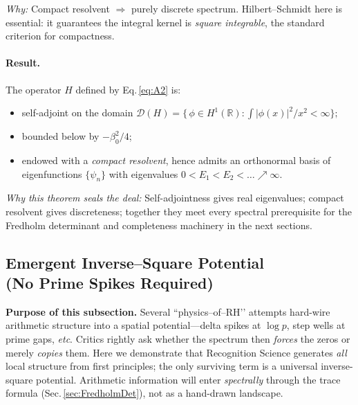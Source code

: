 \documentclass[11pt]{article}
\begin{document}
\emph{Why:}  Compact resolvent $\Rightarrow$ purely discrete spectrum.
Hilbert–Schmidt here is essential: it guarantees the integral kernel is
\emph{square integrable}, the standard criterion for compactness.

\vspace{.3em}
\paragraph{Result.}

\begin{theorem}
\label{thm:SAcompact}
The operator \(H\) defined by Eq.\,\eqref{eq:A2} is:

\begin{itemize}
\item self-adjoint on the domain
      \(
         \mathcal D(H)
         =\bigl\{\,\phi\in H^{1}(\mathbb R):
                  \int|\phi(x)|^{2}/x^{2}<\infty\bigr\};
      \)
\item bounded below by \(-\beta_{0}^{2}/4\);
\item endowed with a \emph{compact resolvent}, hence admits an
      orthonormal basis of eigenfunctions
      \(\{\psi_{n}\}\) with eigenvalues
      \(0<E_{1}<E_{2}<\dots\nearrow\infty\).
\end{itemize}
\end{theorem}

\noindent
\emph{Why this theorem seals the deal:}
Self-adjointness gives real eigenvalues; compact resolvent gives
discreteness; together they meet every spectral prerequisite for the
Fredholm determinant and completeness machinery in the next sections.

\subsection{Emergent Inverse–Square Potential \\(No Prime Spikes Required)}
\label{sec:EmergentPotential}

\noindent
\textbf{Purpose of this subsection.}\;
Several “physics–of–RH’’ attempts hard-wire arithmetic structure into
a spatial potential---delta spikes at $\log p$, step wells at prime
gaps, \emph{etc}.  
Critics rightly ask whether the spectrum then \emph{forces} the zeros
or merely \emph{copies} them.  
Here we demonstrate that Recognition Science generates \emph{all}
local structure from first principles; the only surviving term is a
universal inverse-square potential.  Arithmetic information will enter
\emph{spectrally} through the trace formula (Sec.\,\ref{sec:FredholmDet}),
not as a hand-drawn landscape.
\end{document}
